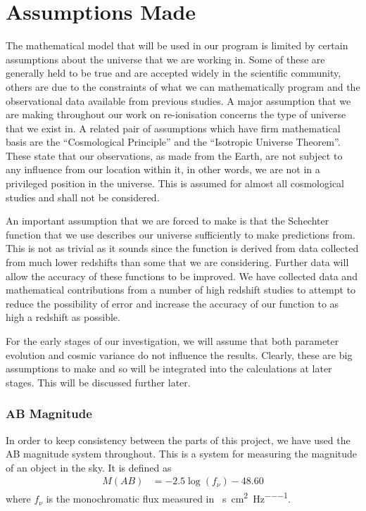
\section{Assumptions Made} %
\label{sec:assumptions_made}
	The mathematical model that will be used in our program is limited by certain assumptions about the universe that we are working in. Some of these are generally held to be true and are accepted widely in the scientific community, others are due to the constraints of what we can mathematically program and the observational data available from previous studies. A major assumption that we are making throughout our work on re-ionisation concerns the type of universe that we exist in. A related pair of assumptions which have firm mathematical basis are the ``Cosmological Principle'' and the ``Isotropic Universe Theorem''. These state that our observations, as made from the Earth, are not subject to any influence from our location within it, in other words, we are not in a privileged position in the universe. This is assumed for almost all cosmological studies and shall not be considered.

	An important assumption that we are forced to make is that the Schechter function that we use describes our universe sufficiently to make predictions from. This is not as trivial as it sounds since the function is derived from data collected from much lower redshifts than some that we are considering. Further data will allow the accuracy of these functions to be improved. We have collected data and mathematical contributions from a number of high redshift studies to attempt to reduce the possibility of error and increase the accuracy of our function to as high a redshift as possible.

	For the early stages of our investigation, we will assume that both parameter evolution and cosmic variance do not influence the results. Clearly, these are big assumptions to make and so will be integrated into the calculations at later stages. This will be discussed further later.

	\subsubsection{AB Magnitude} %
	\label{ssub:ab_magnitude}
		In order to keep consistency between the parts of this project, we have used the AB magnitude system throughout. This is a system for measuring the magnitude of an object in the sky. It is defined as
		\begin{align}
			M(AB) &= -2.5\log(f_\nu) -48.60
		\end{align}
		where $f_\nu$ is the monochromatic flux measured in \si{\erg\per\second\per\square\centi\metre\per\hertz}.

